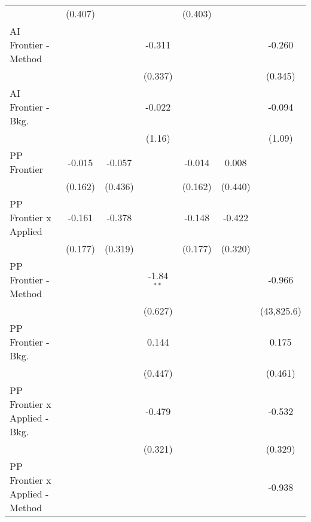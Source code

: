 \begin{tabular}{lcccccc}
                                  & (0.407)       &              &               & (0.403)        &               &   \\   
   AI Frontier - Method           &               &              & -0.311        &                &               & -0.260\\   
                                  &               &              & (0.337)       &                &               & (0.345)\\   
   AI Frontier - Bkg.             &               &              & -0.022        &                &               & -0.094\\   
                                  &               &              & (1.16)        &                &               & (1.09)\\   
   PP Frontier                    & -0.015        & -0.057       &               & -0.014         & 0.008         &   \\   
                                  & (0.162)       & (0.436)      &               & (0.162)        & (0.440)       &   \\   
   PP Frontier x Applied          & -0.161        & -0.378       &               & -0.148         & -0.422        &   \\   
                                  & (0.177)       & (0.319)      &               & (0.177)        & (0.320)       &   \\   
   PP Frontier - Method           &               &              & -1.84$^{**}$  &                &               & -0.966\\   
                                  &               &              & (0.627)       &                &               & (43,825.6)\\   
   PP Frontier - Bkg.             &               &              & 0.144         &                &               & 0.175\\   
                                  &               &              & (0.447)       &                &               & (0.461)\\   
   PP Frontier x Applied - Bkg.   &               &              & -0.479        &                &               & -0.532\\   
                                  &               &              & (0.321)       &                &               & (0.329)\\   
   PP Frontier x Applied - Method &               &              &               &                &               & -0.938\\   

\end{tabular}
